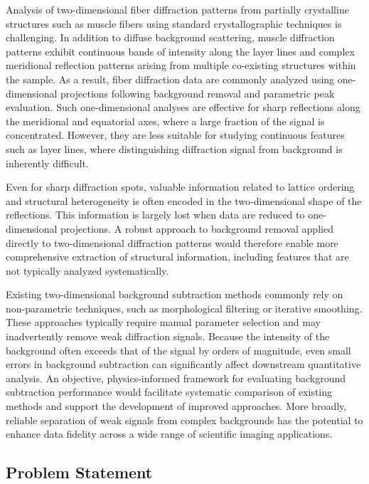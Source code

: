 \documentclass[iucr,review]{iucrjournals}
\begin{document}
Analysis of two-dimensional fiber diffraction patterns from partially crystalline structures such as muscle fibers using standard crystallographic techniques is challenging. In addition to diffuse background scattering, muscle diffraction patterns exhibit continuous bands of intensity along the layer lines and complex meridional reflection patterns arising from multiple co-existing structures within the sample. As a result, fiber diffraction data are commonly analyzed using one-dimensional projections following background removal and parametric peak evaluation. Such one-dimensional analyses are effective for sharp reflections along the meridional and equatorial axes, where a large fraction of the signal is concentrated. However, they are less suitable for studying continuous features such as layer lines, where distinguishing diffraction signal from background is inherently difficult.

Even for sharp diffraction spots, valuable information related to lattice ordering and structural heterogeneity is often encoded in the two-dimensional shape of the reflections. This information is largely lost when data are reduced to one-dimensional projections. A robust approach to background removal applied directly to two-dimensional diffraction patterns would therefore enable more comprehensive extraction of structural information, including features that are not typically analyzed systematically.

Existing two-dimensional background subtraction methods commonly rely on non-parametric techniques, such as morphological filtering or iterative smoothing. These approaches typically require manual parameter selection and may inadvertently remove weak diffraction signals. Because the intensity of the background often exceeds that of the signal by orders of magnitude, even small errors in background subtraction can significantly affect downstream quantitative analysis. An objective, physics-informed framework for evaluating background subtraction performance would facilitate systematic comparison of existing methods and support the development of improved approaches. More broadly, reliable separation of weak signals from complex backgrounds has the potential to enhance data fidelity across a wide range of scientific imaging applications.

\subsection{Problem Statement}
\end{document}
